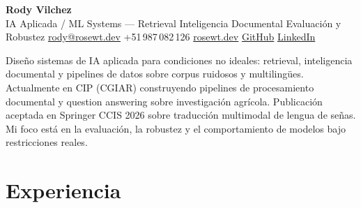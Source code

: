 \documentclass[a4paper,10pt]{article}
\begin{document}
\begin{center}
  \textbf{\LARGE Rody Vilchez}\\[4pt]
  IA Aplicada / ML Systems --- Retrieval \textperiodcentered{} Inteligencia Documental \textperiodcentered{} Evaluación y Robustez  \small
  \enspace\textbar\enspace
  \href{mailto:rody@rosewt.dev}{rody@rosewt.dev} 
  +51\,987\,082\,126 \enspace\textbar\enspace
  \href{https://rosewt.dev}{rosewt.dev} \enspace\textbar\enspace
  \href{https://github.com/R0SEWT}{GitHub} \enspace\textbar\enspace
  \href{https://www.linkedin.com/in/r0sewt/}{LinkedIn}
\end{center}

\vspace{2pt}

\small
Diseño sistemas de IA aplicada para condiciones no ideales: retrieval, inteligencia documental y pipelines de datos sobre corpus ruidosos y multilingües. Actualmente en CIP (CGIAR) construyendo pipelines de procesamiento documental y question answering sobre investigación agrícola. Publicación aceptada en Springer CCIS 2026 sobre traducción multimodal de lengua de señas. Mi foco está en la evaluación, la robustez y el comportamiento de modelos bajo restricciones reales.
\vspace{2pt}

\section*{Experiencia}
\end{document}
